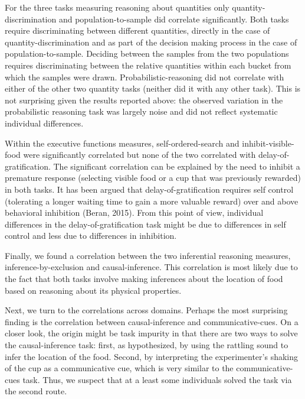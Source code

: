\documentclass[
  man,floatsintext]{apa6}
\begin{document}
For the three tasks measuring reasoning about quantities only quantity-discrimination and population-to-sample did correlate significantly. Both tasks require discriminating between different quantities, directly in the case of quantity-discrimination and as part of the decision making process in the case of population-to-sample. Deciding between the samples from the two populations requires discriminating between the relative quantities within each bucket from which the samples were drawn. Probabilistic-reasoning did not correlate with either of the other two quantity tasks (neither did it with any other task). This is not surprising given the results reported above: the observed variation in the probabilistic reasoning task was largely noise and did not reflect systematic individual differences.

Within the executive functions measures, self-ordered-search and inhibit-visible-food were significantly correlated but none of the two correlated with delay-of-gratification. The significant correlation can be explained by the need to inhibit a premature response (selecting visible food or a cup that was previously rewarded) in both tasks. It has been argued that delay-of-gratification requires self control (tolerating a longer waiting time to gain a more valuable reward) over and above behavioral inhibition (Beran, 2015). From this point of view, individual differences in the delay-of-gratification task might be due to differences in self control and less due to differences in inhibition.

Finally, we found a correlation between the two inferential reasoning measures, inference-by-exclusion and causal-inference. This correlation is most likely due to the fact that both tasks involve making inferences about the location of food based on reasoning about its physical properties.

Next, we turn to the correlations across domains. Perhaps the most surprising finding is the correlation between causal-inference and communicative-cues. On a closer look, the origin might be task impurity in that there are two ways to solve the causal-inference task: first, as hypothesized, by using the rattling sound to infer the location of the food. Second, by interpreting the experimenter's shaking of the cup as a communicative cue, which is very similar to the communicative-cues task. Thus, we suspect that at a least some individuals solved the task via the second route.
\end{document}

